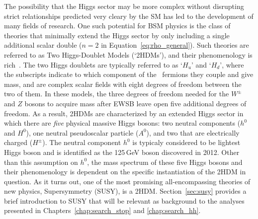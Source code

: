 The possibility that the Higgs sector may be more complex without disrupting strict relationships
predicted very cleary by the SM has led to the development of many fields of research.
One such potential for BSM physics is the class of theories that minimally extend the
Higgs sector by only including a single additional scalar double ($n = 2$ in Equation~\ref{eq:rho_general}).
Such theories are referred to as Two Higgs-Doublet Models (`2HDMs'), and their
phenomenology is rich~\cite{2HDMPheno}.
The two Higgs doublets are typically referred to as `$H_u$' and `$H_d$', where the subscripts
indicate to which component of the \SUtwo~fermions they couple and give mass, and are complex scalar
fields with eight degrees of freedom between the two of them.
In these models, the three degrees of freedom needed for the $W^{\pm}$ and $Z$ bosons
to acquire mass after EWSB leave open five additional degrees of freedom.
As a result, 2HDMs are characterized by an extended Higgs sector in which there are \textit{five}
physical massive Higgs bosons: two neutral components ($h^0$ and $H^0$), one neutral pseudoscalar particle ($A^0$),
and two that are electrically charged ($H^{\pm}$).
The neutral component $h^0$ is typicaly considered to be lightest Higgs boson and is identified as the
125\,GeV boson discovered in 2012.
Other than this assumption on $h^0$, the mass spectrum of these five Higgs bosons and their 
phenomenology is dependent on the specific instantiation of the 2HDM in question.
As it turns out, one of the most promising all-encompassing theories of new physics,
Supersymmetry (SUSY), is a 2HDM.
Section~\ref{sec:susy} provides a brief introduction to SUSY that will be relevant
as background to the analyses presented in Chapters~\ref{chap:search_stop} and \ref{chap:search_hh}.

%
%

